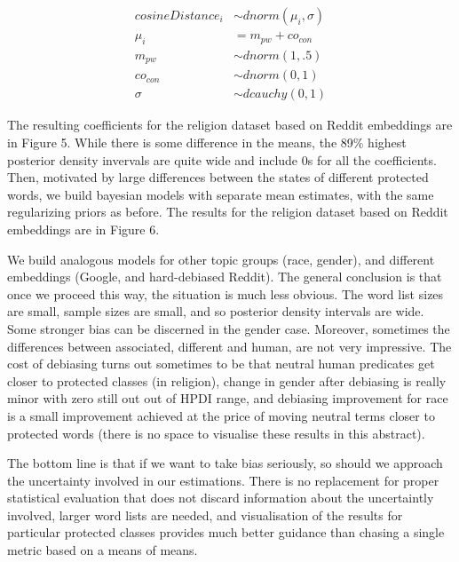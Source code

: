 \documentclass[12pt,dvipsnames,enabledeprecatedfontcommands]{scrartcl}
\begin{document}
\footnotesize 

\vspace{-5mm}

\begin{align}
cosineDistance_i  & \sim dnorm(\mu_i, \sigma) \\
\mu_i & = m_{pw} + co_{con}\\
m_{pw} & \sim dnorm(1,.5) \\
co_{con} & \sim dnorm(0,1) \\
\sigma &\sim  dcauchy(0,1)
\end{align}

\normalsize 

The resulting coefficients for the religion dataset based on Reddit
embeddings are in Figure 5. While there is some difference in the means,
the 89\% highest posterior density invervals are quite wide and include
0s for all the coefficients. Then, motivated by large differences
between the states of different protected words, we build bayesian
models with separate mean estimates, with the same regularizing priors
as before. The results for the religion dataset based on Reddit
embeddings are in Figure 6.

We build analogous models for other topic groups (race, gender), and
different embeddings (Google, and hard-debiased Reddit). The general
conclusion is that once we proceed this way, the situation is much less
obvious. The word list sizes are small, sample sizes are small, and so
posterior density intervals are wide. Some stronger bias can be
discerned in the gender case. Moreover, sometimes the differences
between associated, different and human, are not very impressive. The
cost of debiasing turns out sometimes to be that neutral human
predicates get closer to protected classes (in religion), change in
gender after debiasing is really minor with zero still out out of HPDI
range, and debiasing improvement for race is a small improvement
achieved at the price of moving neutral terms closer to protected words
(there is no space to visualise these results in this abstract).

The bottom line is that if we want to take bias seriously, so should we
approach the uncertainty involved in our estimations. There is no
replacement for proper statistical evaluation that does not discard
information about the uncertaintly involved, larger word lists are
needed, and visualisation of the results for particular protected
classes provides much better guidance than chasing a single metric based
on a means of means.
\end{document}
